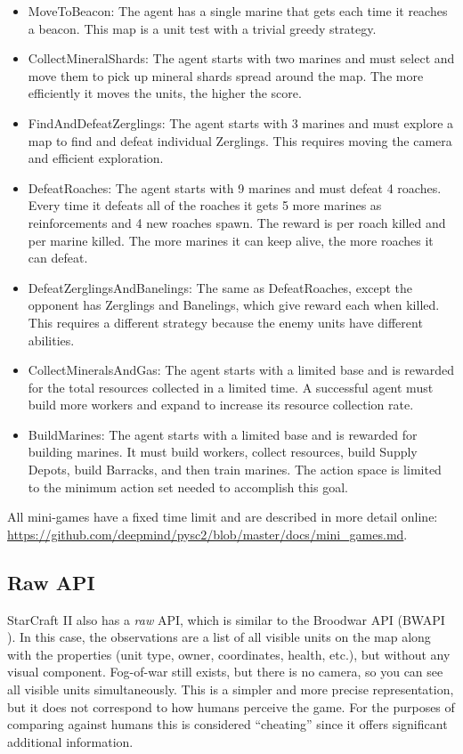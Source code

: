 \documentclass{article}
\begin{document}
\begin{itemize}
\item MoveToBeacon: The agent has a single marine that gets  each time it reaches a beacon. This map is a unit test with a trivial greedy strategy.
\item CollectMineralShards: The agent starts with two marines and must select and move them to pick up mineral shards spread around the map. The more efficiently it moves the units, the higher the score.
\item FindAndDefeatZerglings: The agent starts with 3 marines and must explore a map to find and defeat individual Zerglings. This requires moving the camera and efficient exploration.
\item DefeatRoaches: The agent starts with 9 marines and must defeat 4 roaches. Every time it defeats all of the roaches it gets 5 more marines as reinforcements and 4 new roaches spawn. The reward is  per roach killed and  per marine killed. The more marines it can keep alive, the more roaches it can defeat.
\item DefeatZerglingsAndBanelings: The same as DefeatRoaches, except the opponent has Zerglings and Banelings, which give  reward each when killed. This requires a different strategy because the enemy units have different abilities.
\item CollectMineralsAndGas: The agent starts with a limited base and is rewarded for the total resources collected in a limited time. A successful agent must build more workers and expand to increase its resource collection rate.
\item BuildMarines: The agent starts with a limited base and is rewarded for building marines. It must build workers, collect resources, build Supply Depots, build Barracks, and then train marines. The action space is limited to the minimum action set needed to accomplish this goal.
\end{itemize}

All mini-games have a fixed time limit and are described in more detail online: \url{
https://github.com/deepmind/pysc2/blob/master/docs/mini_games.md}.

\subsection{Raw API}

StarCraft II also has a \emph{raw} API, which is similar to the Broodwar API (BWAPI \cite{BWAPI}). 
In this case, the observations are a list of all visible units on the map along with the properties (unit type, owner, coordinates, health, etc.), but without any visual component. Fog-of-war still exists, but there is no camera, so you can see all visible units simultaneously. This is a simpler and more precise representation, but it does not correspond to how humans perceive the game. For the purposes of comparing against humans this is considered ``cheating'' since it offers significant additional information.
\end{document}
